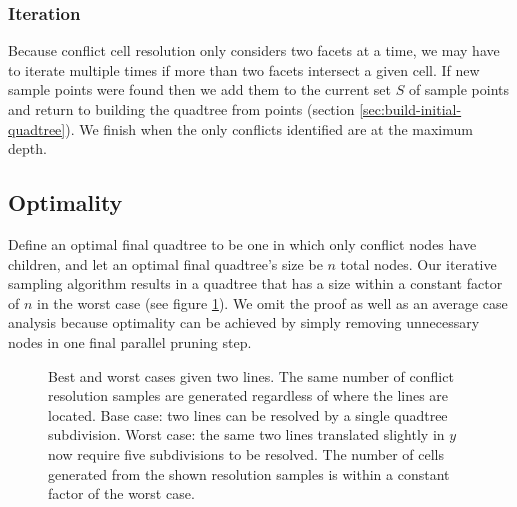 \documentclass[final,3p,times,twocolumn]{elsarticle}
\begin{document}
\subsubsection{Iteration}
\label{sec:iterate}

Because conflict cell resolution only considers two facets at a time, we may have to iterate multiple times if more than two facets intersect a given cell. If new sample points were found then we add them to the current set $S$ of sample points and return to building the quadtree from points (section \ref{sec:build-initial-quadtree}). We finish when the only conflicts identified are at the maximum depth.

\subsection{Optimality}
Define an optimal final quadtree to be one in which only conflict nodes have children, and let an optimal final quadtree's size be $n$ total nodes. Our iterative sampling algorithm results in a quadtree that has a size within a constant factor of $n$ in the worst case (see figure \ref{fig:optimality}). We omit the proof as well as an average case analysis because optimality can be achieved by simply removing unnecessary nodes in one final parallel pruning step.

\begin{figure}
  \centering
  \caption{
    Best and worst cases given two lines. The same number of conflict resolution samples are generated regardless of where the lines are located.
    \protect{} Base case: two lines can be resolved by a single quadtree subdivision.
    \protect{} Worst case: the same two lines translated slightly in $y$ now require five subdivisions to be resolved.
    \protect{} The number of cells generated from the shown resolution samples is within a constant factor of the worst case.
  }
  \label{fig:optimality}
\end{figure}

\end{document}

